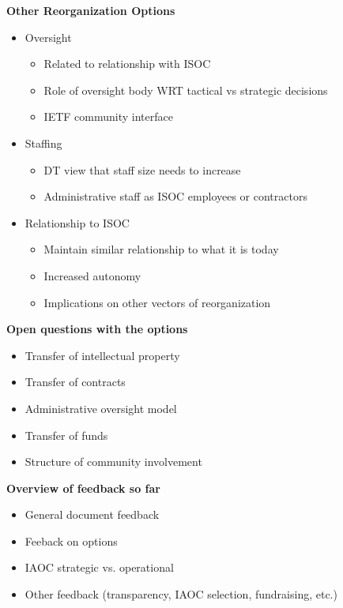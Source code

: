 \documentclass[helvetica]{seminar}
\newcommand{\heading}[1]{%
  \begin{center} 
    \large\bf 
    #1 
  \end{center} 
  \vspace{.4 in}}
\begin{document}
\begin{slide}

\heading{Other Reorganization Options}

\begin{itemize}
\item Oversight
{\footnotesize
\begin{itemize}
\item Related to relationship with ISOC
\item Role of oversight body WRT tactical vs strategic decisions
\item IETF community interface
\end{itemize}
}
\item Staffing
{\footnotesize
\begin{itemize}
\item DT view that staff size needs to increase
\item Administrative staff as ISOC employees or contractors
\end{itemize}
}
\item Relationship to ISOC
{\footnotesize
\begin{itemize}
\item Maintain similar relationship to what it is today
\item Increased autonomy
\item Implications on other vectors of reorganization
\end{itemize}
}
\end{itemize}

\end{slide}

\begin{slide}

\heading{Open questions with the options}

\begin{itemize}
\item Transfer of intellectual property
\item Transfer of contracts
\item Administrative oversight model
\item Transfer of funds
\item Structure of community involvement
\end{itemize}

\end{slide}

\begin{slide}

\heading{Overview of feedback so far}

\begin{itemize}
\item General document feedback
\item Feeback on options
\item IAOC strategic vs. operational
\item Other feedback (transparency, IAOC selection, fundraising, etc.)
\end{itemize}

\end{slide}
\end{document}
